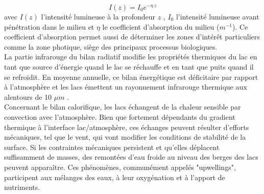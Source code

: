 \begin{equation}
\label{eq:beer_lambert}
I(z) = I_{0}e^{-\eta \: z}
\end{equation}
avec $I(z)$ l'intensité lumineuse à la profondeur $z$ , $I_{0}$ l'intensité lumineuse avant pénétration dans le milieu et $\eta$ le coefficient d'absorption du milieu ($m^{-1}$).
\noindent Ce coefficient d'absorption permet aussi de déterminer les zones d'intérêt particuliers comme la zone photique, siège des principaux processus biologiques.\\

La partie infrarouge du bilan radiatif modifie les propriétés thermiques du lac en tant que source d'énergie quand le lac se réchauffe et en tant que puits quand il se refroidit. En moyenne annuelle, ce bilan énergétique est déficitaire par rapport à l'atmosphère et les lacs émettent un rayonnement infrarouge thermique aux alentours de 10 $\mu m$ \citep{touchart2002}.\\
Concernant le bilan calorifique, les lacs échangent de la chaleur sensible par convection avec l'atmosphère. Bien que fortement dépendants du gradient thermique à l'interface lac/atmosphère, ces échanges peuvent résulter d'efforts mécaniques, tel que le vent, qui vont modifier les conditions de stabilité de la surface. Si les contraintes mécaniques persistent et qu'elles déplacent suffisamment de masses, des remontées d'eau froide au niveau des berges des lacs peuvent apparaître. Ces phénomènes, communément appelés "upwellings", participent aux mélanges des eaux, à leur oxygénation et à l'apport de nutriments.\\


